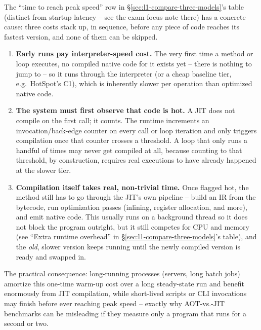 \documentclass[full-course-notes.tex]{subfiles}
\begin{document}
\begin{coreidea}
The ``time to reach peak speed'' row in \S\ref{sec:l1-compare-three-models}'s table (distinct
from startup latency -- see the exam-focus note there) has a concrete cause: three costs stack
up, in sequence, before any piece of code reaches its fastest version, and none of them can be
skipped.
\begin{enumerate}
  \item \textbf{Early runs pay interpreter-speed cost.} The very first time a method or loop
  executes, no compiled native code for it exists yet -- there is nothing to jump to -- so it
  runs through the interpreter (or a cheap baseline tier, e.g.\ HotSpot's C1), which is
  inherently slower per operation than optimized native code.
  \item \textbf{The system must first observe that code is hot.} A JIT does not compile on the
  first call; it counts. The runtime increments an invocation/back-edge counter on every call or
  loop iteration and only triggers compilation once that counter crosses a threshold. A loop
  that only runs a handful of times may never get compiled at all, because counting to that
  threshold, by construction, requires real executions to have already happened at the slower
  tier.
  \item \textbf{Compilation itself takes real, non-trivial time.} Once flagged hot, the method
  still has to go through the JIT's own pipeline -- build an IR from the bytecode, run
  optimization passes (inlining, register allocation, and more), and emit native code. This
  usually runs on a background thread so it does not block the program outright, but it still
  competes for CPU and memory (see ``Extra runtime overhead'' in \S\ref{sec:l1-compare-three-models}'s
  table), and the \emph{old}, slower version keeps running until the newly compiled version is
  ready and swapped in.
\end{enumerate}
The practical consequence: long-running processes (servers, long batch jobs) amortize this
one-time warm-up cost over a long steady-state run and benefit enormously from JIT compilation,
while short-lived scripts or CLI invocations may finish before ever reaching peak speed --
exactly why AOT-vs.-JIT benchmarks can be misleading if they measure only a program that runs
for a second or two.
\end{coreidea}
\end{document}
